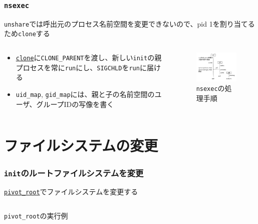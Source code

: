 \documentclass[unicode, 14pt, aspectratio=169]{beamer}
\begin{document}
\begin{frame}[t]
  \frametitle{\texttt{nsexec}}
  \texttt{unshare}では呼出元のプロセス名前空間を変更できないので、pid 1を割り当てるため\texttt{clone}する
  \begin{columns}
    \begin{column}{0.5\textwidth}
      \begin{itemize}[leftmargin=0.8cm,label=$\circ$]
      \item \href{https://man7.org/linux/man-pages/man2/clone.2.html}{\texttt{clone}}に\texttt{CLONE\_PARENT}を渡し、新しい\texttt{init}の親プロセスを常に\texttt{run}にし、\texttt{SIGCHLD}を\texttt{run}に届ける
      \item \texttt{uid\_map}, \texttt{gid\_map}には、親と子の名前空間のユーザ、グループIDの写像を書く
      \end{itemize}
    \end{column}
    \begin{column}{0.5\textwidth}
      \begin{figure}
        \centering
        \includegraphics[width=6cm]{images/nsenter.drawio.pdf}
        \caption{\texttt{nsexec}の処理手順}
        \label{fig:nsenter}
      \end{figure}      
    \end{column}
  \end{columns}
\end{frame} 
\section{ファイルシステムの変更}
\begin{frame}
  \frametitle{\texttt{init}のルートファイルシステムを変更}
  \href{https://man7.org/linux/man-pages/man2/pivot_root.2.html}{\texttt{pivot\_root}}でファイルシステムを変更する
  \begin{center}
    \inputminted{sh}{code/pivot_root.sh}
    \texttt{pivot\_root}の実行例
  \end{center}
\end{frame}
\end{document}
